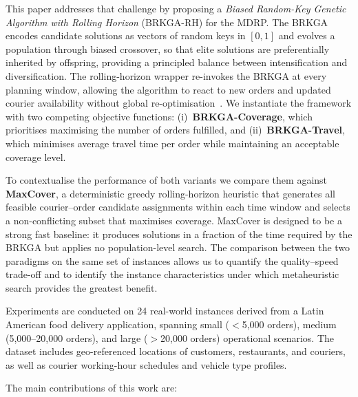 This paper addresses that challenge by proposing a
\emph{Biased Random-Key Genetic Algorithm with Rolling Horizon}
(BRKGA-RH) for the MDRP.
The BRKGA~\cite{goncalves2011brkga} encodes candidate solutions
as vectors of random keys in $[0,1]$ and evolves a population
through biased crossover, so that elite solutions are
preferentially inherited by offspring, providing a principled
balance between intensification and diversification.
The rolling-horizon wrapper re-invokes the BRKGA at every
planning window, allowing the algorithm to react to new orders
and updated courier availability without global
re-optimisation~\cite{reyes2018mdrp}.
We instantiate the framework with two competing objective
functions: (i)~\textbf{BRKGA-Coverage}, which prioritises
maximising the number of orders fulfilled, and
(ii)~\textbf{BRKGA-Travel}, which minimises average travel time
per order while maintaining an acceptable coverage level.

To contextualise the performance of both variants we compare them
against \textbf{MaxCover}, a deterministic greedy rolling-horizon
heuristic that generates all feasible courier--order candidate
assignments within each time window and selects a non-conflicting
subset that maximises coverage.
MaxCover is designed to be a strong fast baseline: it produces
solutions in a fraction of the time required by the BRKGA but
applies no population-level search.
The comparison between the two paradigms on the same set of
instances allows us to quantify the quality--speed trade-off
and to identify the instance characteristics under which
metaheuristic search provides the greatest benefit.

Experiments are conducted on 24 real-world instances derived from
a Latin American food delivery application, spanning small
($<$5{,}000 orders), medium (5{,}000--20{,}000 orders), and
large ($>$20{,}000 orders) operational scenarios.
The dataset includes geo-referenced locations of customers,
restaurants, and couriers, as well as courier working-hour
schedules and vehicle type profiles.

The main contributions of this work are:

